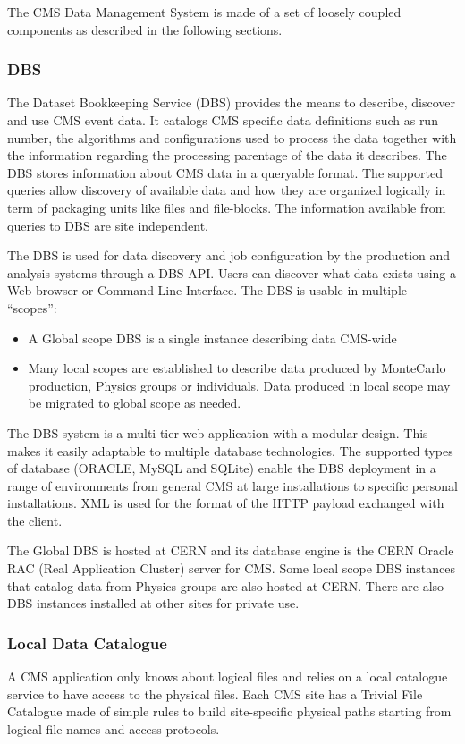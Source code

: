 The CMS Data Management System is made of a set of loosely coupled components as described in the following sections.
\subsubsection{DBS}
\label{sec:3_1_1}
The Dataset Bookkeeping Service (DBS)\cite{RefDBS} provides the means to describe, discover and use CMS event data. 
It catalogs CMS specific data definitions such as run number, the algorithms and configurations used to process the data together with the information regarding the processing parentage of the data it describes.
The DBS stores information about CMS data in a queryable format. The supported queries allow discovery of available data and how they are organized logically in term of packaging units like files and file-blocks. The information available from queries to DBS are site independent.

The DBS is used for data discovery and job configuration by the production and analysis systems through a DBS API. 
Users can discover what data exists using a Web browser or Command Line Interface.
The DBS is usable in multiple “scopes”:
\begin{itemize}
\item A Global scope DBS is a single instance describing data CMS-wide 
\item Many local scopes are established to describe data produced by MonteCarlo production, Physics groups or individuals. 
Data produced in local scope may be migrated to global scope as needed.

\end{itemize}
The DBS system is a multi-tier web application with a modular design. This makes it easily adaptable to multiple database technologies. The supported types of database (ORACLE, MySQL and SQLite) enable the DBS deployment in a range of environments from general CMS at large installations to specific personal installations.
XML is used for the format of the HTTP payload exchanged with the client.

The Global DBS is hosted at CERN and its database engine is the CERN Oracle RAC (Real Application Cluster) server for CMS. Some local scope DBS instances that catalog data from Physics groups are also hosted at CERN. There are also DBS instances installed at other sites for private use. 

\subsubsection{Local Data Catalogue}
\label{sec:3_1_2}
A CMS application only knows about logical files and relies on a local catalogue service to have access to the physical files.
Each CMS site has a Trivial File Catalogue made of simple rules to build site-specific physical paths starting from logical file names and access protocols.

